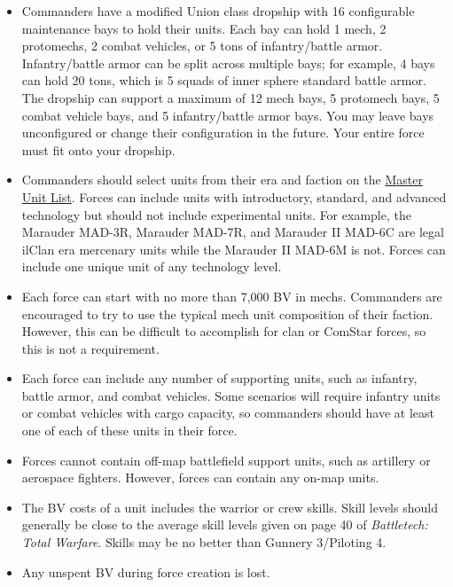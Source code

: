 \documentclass[UTF8]{article}
\begin{document}
\begin{itemize}

\item Commanders have a modified Union class dropship with 16 configurable maintenance bays to hold their units.
Each bay can hold 1 mech, 2 protomechs, 2 combat vehicles, or 5 tons of infantry/battle armor.
Infantry/battle armor can be split across multiple bays; for example, 4 bays can hold 20 tons, which is 5 squads of inner sphere standard battle armor.
The dropship can support a maximum of 12 mech bays, 5 protomech bays, 5 combat vehicle bays, and 5 infantry/battle armor bays.
You may leave bays unconfigured or change their configuration in the future.
Your entire force must fit onto your dropship.

\item Commanders should select units from their era and faction on the \href{http://www.masterunitlist.info/}{Master Unit List}.
Forces can include units with introductory, standard, and advanced technology but should not include experimental units.
For example, the Marauder MAD-3R, Marauder MAD-7R, and Marauder II MAD-6C are legal ilClan era mercenary units while the Marauder II MAD-6M is not.
Forces can include one unique unit of any technology level.

\item Each force can start with no more than 7,000 BV in mechs.
Commanders are encouraged to try to use the typical mech unit composition of their faction.
However, this can be difficult to accomplish for clan or ComStar forces, so this is not a requirement.

\item Each force can include any number of supporting units, such as infantry, battle armor, and combat vehicles.
Some scenarios will require infantry units or combat vehicles with cargo capacity, so commanders should have at least one of each of these units in their force.

\item Forces cannot contain off-map battlefield support units, such as artillery or aerospace fighters.
However, forces can contain any on-map units.

\item The BV costs of a unit includes the warrior or crew skills.
Skill levels should generally be close to the average skill levels given on page 40 of \emph{Battletech: Total Warfare}.
Skills may be no better than Gunnery 3/Piloting 4.

\item Any unspent BV during force creation is lost.

\end{itemize}
\end{document}
